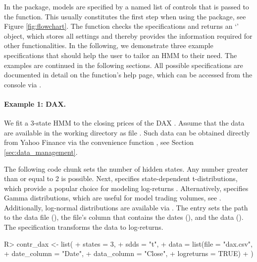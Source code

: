 \documentclass[article,shortnames]{jss}
\newcommand{\class}[1]{`\code{#1}'}
\newcommand{\fct}[1]{\code{#1()}}
\begin{document}
In the  package, models are specified by a named list of controls that is passed to the \fct{set\_controls} function. This usually constitutes the first step when using the package, see Figure \ref{fig:flowchart}. The function checks the specifications and returns an \class{fHMM\_controls} object, which stores all settings and thereby provides the information required for other functionalities. In the following, we demonstrate three example specifications that should help the user to tailor an HMM to their need. The examples are continued in the following sections. All possible specifications are documented in detail on the function's help page, which can be accessed from the  console via .

\paragraph{Example 1: DAX.} We fit a 3-state HMM to the closing prices of the DAX \citep{jan92}. Assume that the data are available in the working directory as file . Such data can be obtained directly from Yahoo Finance via the convenience function \fct{download\_data}, see Section \ref{sec:data_management}.

The following code chunk sets the number  of hidden states. Any number greater than or equal to 2 is possible. Next,  specifies state-dependent t-distributions, which provide a popular choice for modeling log-returns \citep{pla08}. Alternatively,  specifies Gamma distributions, which are useful for model trading volumes, see \cite{ada20}. Additionally, log-normal distributions are available via . The  entry sets the path to the data file (), the file's column that contains the dates (), and the data (). The specification  transforms the data to log-returns.

%
\begin{Schunk}
\begin{Sinput}
R> contr_dax <- list(
+    states = 3,
+    sdds   = "t",
+    data   = list(file        = "dax.csv",
+                  date_column = "Date",
+                  data_column = "Close",
+                  logreturns  = TRUE)
+  )
\end{Sinput}
\end{Schunk}
%
\end{document}
